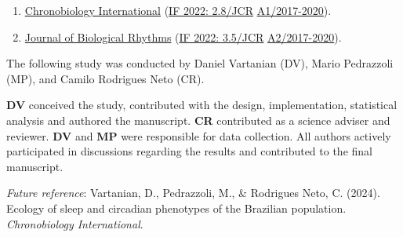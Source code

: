 \documentclass[
12pt,
openright,
oneside,
a4paper,
chapter=TITLE,
section=TITLE,
french,
spanish,
brazil,
english
]{abntex2}\usepackage{array}
\newcommand{\microskip}{\vspace{\microskipamount}}
\begin{document}
\begin{tcolorbox}[enhanced jigsaw, colframe=quarto-callout-note-color-frame, coltitle=black, opacityback=0, left=2mm, opacitybacktitle=0.6, rightrule=.15mm, leftrule=.75mm, colbacktitle=quarto-callout-note-color!10!white, titlerule=0mm, title=\textcolor{quarto-callout-note-color}{\faInfo}\hspace{0.5em}{Target journal}, colback=white, breakable, bottomtitle=1mm, toptitle=1mm, arc=.35mm, bottomrule=.15mm, toprule=.15mm]

\begin{enumerate}
\def\labelenumi{\arabic{enumi}.}
\tightlist
\item
  \href{https://www.tandfonline.com/action/authorSubmission?show=instructions&journalCode=icbi20}{Chronobiology
  International} (\href{https://jcr.clarivate.com/jcr/}{IF 2022:
  2.8/JCR} \textbar{}
  \href{https://sucupira.capes.gov.br/sucupira/public/consultas/coleta/veiculoPublicacaoQualis/listaConsultaGeralPeriodicos.jsf}{A1/2017-2020}).
\item
  \href{https://journals.sagepub.com/author-instructions/JBR}{Journal of
  Biological Rhythms} (\href{https://jcr.clarivate.com/jcr/}{IF 2022:
  3.5/JCR} \textbar{}
  \href{https://sucupira.capes.gov.br/sucupira/public/consultas/coleta/veiculoPublicacaoQualis/listaConsultaGeralPeriodicos.jsf}{A2/2017-2020}).
\end{enumerate}

\end{tcolorbox}

\begin{tcolorbox}[enhanced jigsaw, colframe=quarto-callout-note-color-frame, coltitle=black, opacityback=0, left=2mm, opacitybacktitle=0.6, rightrule=.15mm, leftrule=.75mm, colbacktitle=quarto-callout-note-color!10!white, titlerule=0mm, title=\textcolor{quarto-callout-note-color}{\faInfo}\hspace{0.5em}{Note}, colback=white, breakable, bottomtitle=1mm, toptitle=1mm, arc=.35mm, bottomrule=.15mm, toprule=.15mm]

The following study was conducted by Daniel Vartanian (DV), Mario
Pedrazzoli (MP), and Camilo Rodrigues Neto (CR).

\microskip

\textbf{DV} conceived the study, contributed with the design,
implementation, statistical analysis and authored the manuscript.
\textbf{CR} contributed as a science adviser and reviewer. \textbf{DV}
and \textbf{MP} were responsible for data collection. All authors
actively participated in discussions regarding the results and
contributed to the final manuscript.

\microskip

\emph{Future reference}: Vartanian, D., Pedrazzoli, M., \& Rodrigues
Neto, C. (2024). Ecology of sleep and circadian phenotypes of the
Brazilian population. \emph{Chronobiology International}.

\end{tcolorbox}
\end{document}
